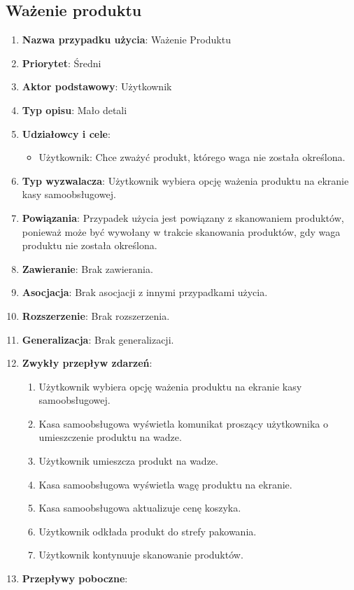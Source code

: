 \documentclass{article}
\begin{document}
\subsection{Ważenie produktu}
\begin{enumerate}
\item \textbf{Nazwa przypadku użycia}: Ważenie Produktu
\item \textbf{Priorytet}: Średni
\item \textbf{Aktor podstawowy}: Użytkownik
\item \textbf{Typ opisu}: Mało detali
\item \textbf{Udziałowcy i cele}:
\begin{itemize}
\item Użytkownik: Chce zważyć produkt, którego waga nie została określona.
\end{itemize}
\item \textbf{Typ wyzwalacza}: Użytkownik wybiera opcję ważenia produktu na ekranie kasy samoobsługowej.
\item \textbf{Powiązania}: Przypadek użycia jest powiązany z skanowaniem produktów, ponieważ może być wywołany w trakcie skanowania produktów, gdy waga produktu nie została określona.
\item \textbf{Zawieranie}: Brak zawierania.
\item \textbf{Asocjacja}: Brak asocjacji z innymi przypadkami użycia.
\item \textbf{Rozszerzenie}: Brak rozszerzenia.
\item \textbf{Generalizacja}: Brak generalizacji.
\item \textbf{Zwykły przepływ zdarzeń}:
\begin{enumerate}
\item Użytkownik wybiera opcję ważenia produktu na ekranie kasy samoobsługowej.
\item Kasa samoobsługowa wyświetla komunikat proszący użytkownika o umieszczenie produktu na wadze.
\item Użytkownik umieszcza produkt na wadze.
\item Kasa samoobsługowa wyświetla wagę produktu na ekranie.
\item Kasa samoobsługowa aktualizuje cenę koszyka.
\item Użytkownik odkłada produkt do strefy pakowania.
\item Użytkownik kontynuuje skanowanie produktów.
\end{enumerate}
\item \textbf{Przepływy poboczne}:

\end{enumerate}
\end{document}
